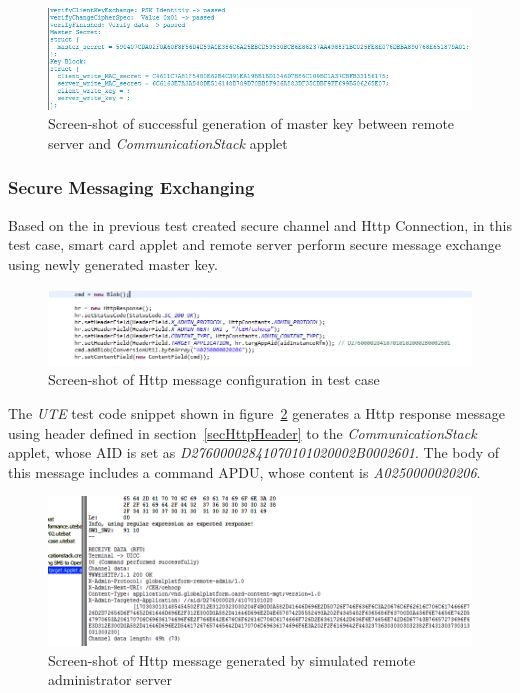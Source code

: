 \begin{figure}[!htb]
	\centering
	\includegraphics[width=1\textwidth]{Images/impl/master-key.png}
		\caption{Screen-shot of successful generation of master key between remote server and \emph{CommunicationStack} applet}
	\label{fig:mk}
\end{figure}


\subsubsection{Secure Messaging Exchanging}



Based on the in previous test created secure channel and Http Connection, in this test case, smart card applet and remote server perform secure message exchange using newly generated master key. 

\begin{figure}[!htb]
	\centering
	\includegraphics[width=1.1\textwidth]{q1.png}
		\caption{Screen-shot of Http message configuration in test case}
	\label{fig:q1}
\end{figure}

The \emph{UTE} test code snippet shown in figure~\ref{fig:q1} generates a Http response message using header defined in section~\ref{secHttpHeader} to the \emph{CommunicationStack} applet, whose AID is set as \emph{D27600002841070101020002B0002601}. The body of this message includes a command APDU, whose content is \emph{A0250000020206}.


\begin{figure}[!htb]
	\centering
	\includegraphics[width=1\textwidth]{q2.png}
		\caption{Screen-shot of Http message generated by simulated remote administrator server}
	\label{fig:q2}
\end{figure}


